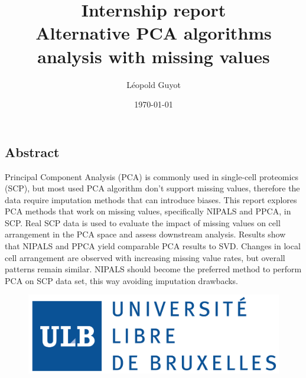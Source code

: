 \documentclass[a4paper, 11pt, twocolumn]{article}
\title{\Large Internship report \\
\huge Alternative PCA algorithms analysis with missing values}
\author{Léopold Guyot}
\date{\today}
\begin{document}
\pagestyle{fancy}
\setlength{\headheight}{25.0117pt}
\fancyhead{}\fancyfoot{}
\fancyfoot[R]{\thepage}

\onecolumn
\maketitle

\begin{tcolorbox}[breakable,colback=white,colframe=black,width=\dimexpr\textwidth+12mm\relax,enlarge left by=-6mm]

\section*{Abstract}
Principal Component Analysis (PCA) is commonly used in single-cell proteomics (SCP), but most used PCA algorithm don't support missing values, therefore the data require imputation methods that can introduce biases. This report explores PCA methods that work on missing values, specifically NIPALS and PPCA, in SCP. Real SCP data is used to evaluate the impact of missing values on cell arrangement in the PCA space and assess downstream analysis. Results show that NIPALS and PPCA yield comparable PCA results to SVD. Changes in local cell arrangement are observed with increasing missing value rates, but overall patterns remain similar. NIPALS should become the preferred method to perform PCA on SCP data set, this way avoiding imputation drawbacks.

\end{tcolorbox}

\begin{figure}[H]
          \begin{minipage}{\textwidth}
                \centering
                \includegraphics[width = .8\linewidth]{img/LOGO_Universite__libre_bruxelles.png}
          \end{minipage}
\end{figure}
\end{document}
